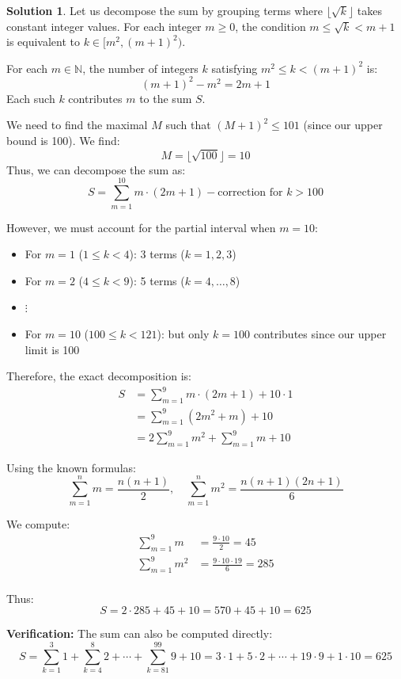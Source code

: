 \documentclass{article}
\theoremstyle{definition}
\newtheorem*{solution}{Solution}
\begin{document}
\begin{solution}
Let us decompose the sum by grouping terms where $\lfloor \sqrt{k} \rfloor$ takes constant integer values. For each integer $m \geq 0$, the condition $m \leq \sqrt{k} < m+1$ is equivalent to $k \in [m^2, (m+1)^2)$.

For each $m \in \mathbb{N}$, the number of integers $k$ satisfying $m^2 \leq k < (m+1)^2$ is:
\[
(m+1)^2 - m^2 = 2m + 1
\]
Each such $k$ contributes $m$ to the sum $S$.

We need to find the maximal $M$ such that $(M+1)^2 \leq 101$ (since our upper bound is 100). We find:
\[
M = \lfloor \sqrt{100} \rfloor = 10
\]
Thus, we can decompose the sum as:
\[
S = \sum_{m=1}^{10} m \cdot (2m + 1) - \text{correction for } k > 100
\]

However, we must account for the partial interval when $m=10$:
\begin{itemize}
\item For $m=1$ ($1 \leq k < 4$): 3 terms ($k=1,2,3$)
\item For $m=2$ ($4 \leq k < 9$): 5 terms ($k=4,\ldots,8$)
\item $\vdots$
\item For $m=10$ ($100 \leq k < 121$): but only $k=100$ contributes since our upper limit is 100
\end{itemize}

Therefore, the exact decomposition is:
\begin{align*}
S &= \sum_{m=1}^9 m \cdot (2m + 1) + 10 \cdot 1 \\
&= \sum_{m=1}^9 (2m^2 + m) + 10 \\
&= 2\sum_{m=1}^9 m^2 + \sum_{m=1}^9 m + 10
\end{align*}

Using the known formulas:
\[
\sum_{m=1}^n m = \frac{n(n+1)}{2}, \quad \sum_{m=1}^n m^2 = \frac{n(n+1)(2n+1)}{6}
\]

We compute:
\begin{align*}
\sum_{m=1}^9 m &= \frac{9 \cdot 10}{2} = 45 \\
\sum_{m=1}^9 m^2 &= \frac{9 \cdot 10 \cdot 19}{6} = 285 \\
\end{align*}

Thus:
\[
S = 2 \cdot 285 + 45 + 10 = 570 + 45 + 10 = 625
\]

\textbf{Verification:} The sum can also be computed directly:
\[
S = \sum_{k=1}^3 1 + \sum_{k=4}^8 2 + \cdots + \sum_{k=81}^{99} 9 + 10 = 3\cdot1 + 5\cdot2 + \cdots + 19\cdot9 + 1\cdot10 = 625
\]
\end{solution}
\end{document}
